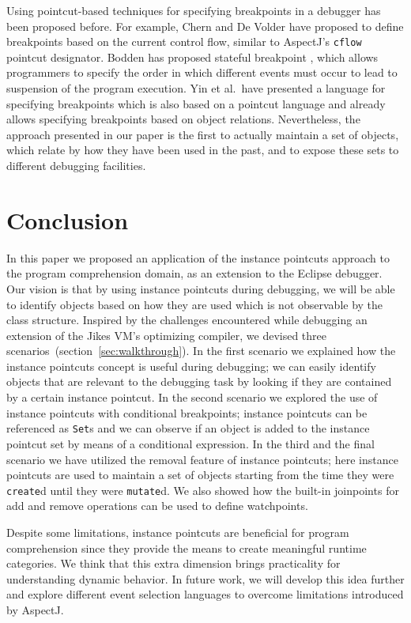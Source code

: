 \documentclass{sig-alternate}
\begin{document}
Using pointcut-based techniques for specifying breakpoints in a debugger has been proposed before.
For example, Chern and De Volder \cite{Chern2007} have proposed to define breakpoints based on the current control flow, similar to AspectJ's \lstinline!cflow! pointcut designator.
Bodden has proposed stateful breakpoint \cite{Bodden2011}, which allows programmers to specify the order in which different events must occur to lead to suspension of the program execution.
Yin et al.\ have presented a language for specifying breakpoints \cite{Yin2013} which is also based on a pointcut language and already allows specifying breakpoints based on object relations.
Nevertheless, the approach presented in our paper is the first to actually maintain a set of objects, which relate by how they have been used in the past, and to expose these sets to different debugging facilities.

\section{Conclusion}
\label{sec:conclusion}
In this paper we proposed an application of the instance pointcuts approach to the program comprehension domain, as an extension to the Eclipse debugger.
Our vision is that by using instance pointcuts during debugging, we will be able to identify objects based on how they are used which is not observable by the class structure.
Inspired by the challenges encountered while debugging an extension of the Jikes VM's optimizing compiler, we devised three scenarios~(section~\ref{sec:walkthrough}).
In the first scenario we explained how the instance pointcuts concept is useful during debugging; we can easily identify objects that are relevant to the debugging task by looking if they are contained by a certain instance pointcut.
In the second scenario we explored the use of instance pointcuts with conditional breakpoints; instance pointcuts can be referenced as \lstinline!Set!s and we can observe if an object is added to the instance pointcut set by means of a conditional expression.
In the third and the final scenario we have utilized the removal feature of instance pointcuts; here instance pointcuts are used to maintain a set of objects starting from the time they were \lstinline!create!d until they were \lstinline!mutate!d.
We also showed how the built-in joinpoints for add and remove operations can be used to define watchpoints.

Despite some limitations, instance pointcuts are beneficial for program comprehension since they provide the means to create meaningful runtime categories.
We think that this extra dimension brings practicality for understanding dynamic behavior.
In future work, we will develop this idea further and explore different event selection languages to overcome limitations introduced by AspectJ.









\balancecolumns
\end{document}
